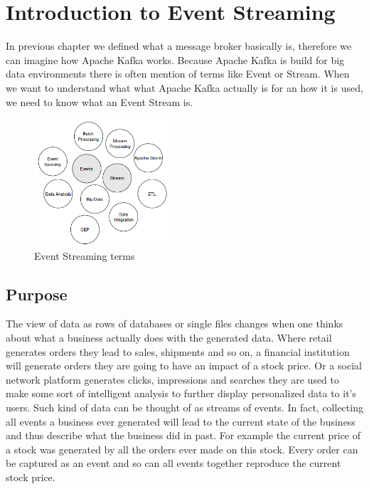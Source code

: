 \chapter{Introduction to Event Streaming}

In previous chapter we defined what a message broker basically is, therefore we
can imagine how Apache Kafka works. Because Apache Kafka is build for big data
environments  there is often mention of terms like Event or
Stream. When we want to understand what what Apache Kafka actually is for an
how it is used, we need to know what an Event Stream is.

\begin{figure}[H]
    \centering
    \includegraphics[width=0.45\textwidth]{images/evenstreaming-intro.png}
    \caption{Event Streaming terms}
    \label{fig:evenstreaming-intro}
\end{figure}

\section{Purpose}
The view of data as rows of databases or single files changes when one thinks
about what a business actually does with the generated data. Where retail
generates orders they lead to sales, shipments and so on, a financial
institution will generate orders they are going to have an impact of a stock
price. Or a social network platform generates clicks, impressions and searches
they are used to make some sort of intelligent analysis to further display
personalized data to it's users. Such kind of data can be thought of as streams
of events. In fact, collecting all events a business ever generated will lead to
the current state of the business and thus describe what the business did in
past. For example the current price of a stock was generated by all the orders
ever made on this stock. Every order can be captured as an event and so can all
events together reproduce the current stock price.

